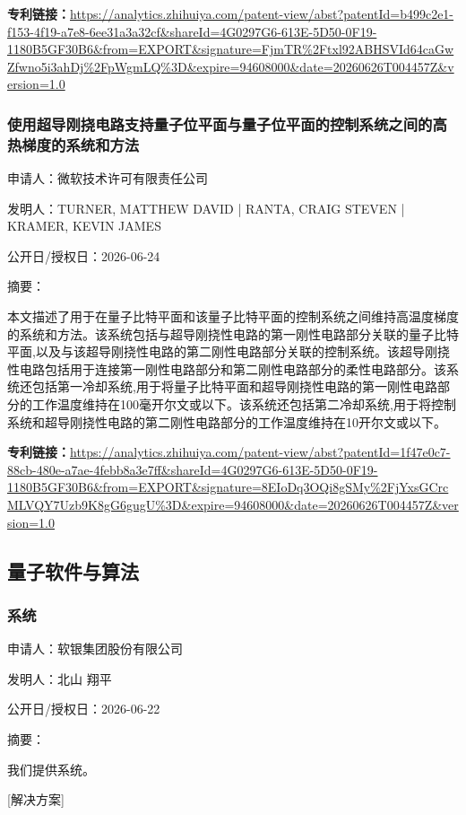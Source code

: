 \documentclass[12pt,a4paper]{ctexart}
\begin{document}
\noindent\textbf{专利链接：}\url{https://analytics.zhihuiya.com/patent-view/abst?patentId=b499c2e1-f153-4f19-a7e8-6ee31a3a32cf&shareId=4G0297G6-613E-5D50-0F19-1180B5GF30B6&from=EXPORT&signature=FjmTR%2Ftxl92ABHSVId64caGwZfwno5i3ahDj%2FpWgmLQ%3D&expire=94608000&date=20260626T004457Z&version=1.0}

\subsubsection{ 使用超导刚挠电路支持量子位平面与量子位平面的控制系统之间的高热梯度的系统和方法 }

申请人：微软技术许可有限责任公司

发明人：TURNER, MATTHEW DAVID | RANTA, CRAIG STEVEN | KRAMER, KEVIN JAMES

公开日/授权日：2026-06-24

摘要：

本文描述了用于在量子比特平面和该量子比特平面的控制系统之间维持高温度梯度的系统和方法。该系统包括与超导刚挠性电路的第一刚性电路部分关联的量子比特平面,以及与该超导刚挠性电路的第二刚性电路部分关联的控制系统。该超导刚挠性电路包括用于连接第一刚性电路部分和第二刚性电路部分的柔性电路部分。该系统还包括第一冷却系统,用于将量子比特平面和超导刚挠性电路的第一刚性电路部分的工作温度维持在100毫开尔文或以下。该系统还包括第二冷却系统,用于将控制系统和超导刚挠性电路的第二刚性电路部分的工作温度维持在10开尔文或以下。

\noindent\textbf{专利链接：}\url{https://analytics.zhihuiya.com/patent-view/abst?patentId=1f47e0c7-88cb-480e-a7ae-4febb8a3e7ff&shareId=4G0297G6-613E-5D50-0F19-1180B5GF30B6&from=EXPORT&signature=8EIoDq3OQi8gSMy%2FjYxsGCrcMLVQY7Uzb9K8gG6gugU%3D&expire=94608000&date=20260626T004457Z&version=1.0}


\subsection{ 量子软件与算法 }

\subsubsection{ 系统 }

申请人：软银集团股份有限公司

发明人：北山 翔平

公开日/授权日：2026-06-22

摘要：

我们提供系统。 

 [解决方案] 
\end{document}
